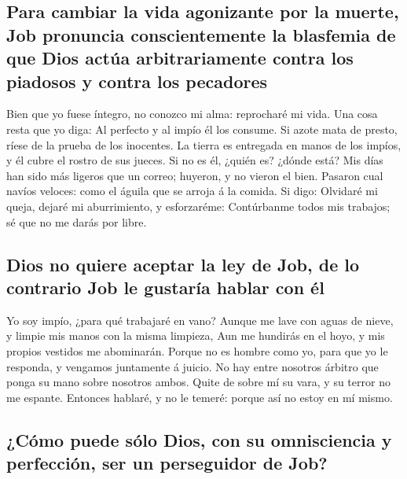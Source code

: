 \hypertarget{para-cambiar-la-vida-agonizante-por-la-muerte-job-pronuncia-conscientemente-la-blasfemia-de-que-dios-actuxfaa-arbitrariamente-contra-los-piadosos-y-contra-los-pecadores}{%
\subsection{Para cambiar la vida agonizante por la muerte, Job pronuncia
conscientemente la blasfemia de que Dios actúa arbitrariamente contra
los piadosos y contra los
pecadores}\label{para-cambiar-la-vida-agonizante-por-la-muerte-job-pronuncia-conscientemente-la-blasfemia-de-que-dios-actuxfaa-arbitrariamente-contra-los-piadosos-y-contra-los-pecadores}}

 Bien que yo fuese íntegro, no conozco mi alma: reprocharé
mi vida.  Una cosa resta que yo diga: Al perfecto y al
impío él los consume.  Si azote mata de presto, ríese de la
prueba de los inocentes.  La tierra es entregada en manos
de los impíos, y él cubre el rostro de sus jueces. Si no es él, ¿quién
es? ¿dónde está?  Mis días han sido más ligeros que un
correo; huyeron, y no vieron el bien.  Pasaron cual navíos
veloces: como el águila que se arroja á la comida.  Si
digo: Olvidaré mi queja, dejaré mi aburrimiento, y esforzaréme:
 Contúrbanme todos mis trabajos; sé que no me darás por
libre.

\hypertarget{dios-no-quiere-aceptar-la-ley-de-job-de-lo-contrario-job-le-gustaruxeda-hablar-con-uxe9l}{%
\subsection{Dios no quiere aceptar la ley de Job, de lo contrario Job le
gustaría hablar con
él}\label{dios-no-quiere-aceptar-la-ley-de-job-de-lo-contrario-job-le-gustaruxeda-hablar-con-uxe9l}}

 Yo soy impío, ¿para qué trabajaré en vano? 
Aunque me lave con aguas de nieve, y limpie mis manos con la misma
limpieza,  Aun me hundirás en el hoyo, y mis propios
vestidos me abominarán.  Porque no es hombre como yo, para
que yo le responda, y vengamos juntamente á juicio.  No hay
entre nosotros árbitro que ponga su mano sobre nosotros ambos.
 Quite de sobre mí su vara, y su terror no me espante.
 Entonces hablaré, y no le temeré: porque así no estoy en
mí mismo.

\hypertarget{cuxf3mo-puede-suxf3lo-dios-con-su-omnisciencia-y-perfecciuxf3n-ser-un-perseguidor-de-job}{%
\subsection{¿Cómo puede sólo Dios, con su omnisciencia y perfección, ser
un perseguidor de
Job?}\label{cuxf3mo-puede-suxf3lo-dios-con-su-omnisciencia-y-perfecciuxf3n-ser-un-perseguidor-de-job}}

